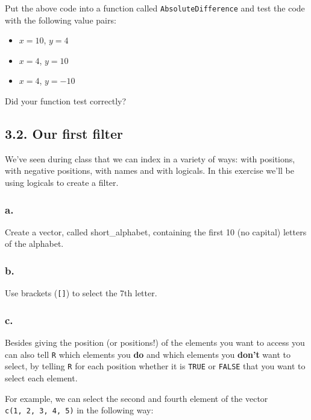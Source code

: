 \documentclass[]{article}
\providecommand{\tightlist}{%
  \setlength{\itemsep}{0pt}\setlength{\parskip}{0pt}}
\begin{document}
Put the above code into a function called \texttt{AbsoluteDifference}
and test the code with the following value pairs:

\begin{itemize}
\tightlist
\item
  \(x=10\), \(y=4\)
\item
  \(x=4\), \(y=10\)
\item
  \(x=4\), \(y=-10\)
\end{itemize}

Did your function test correctly?

\hypertarget{our-first-filter}{%
\subsection{3.2. Our first filter}\label{our-first-filter}}

We've seen during class that we can index in a variety of ways: with
positions, with negative positions, with names and with logicals. In
this exercise we'll be using logicals to create a filter.

\hypertarget{a.-5}{%
\subsubsection{a.}\label{a.-5}}

Create a vector, called short\_alphabet, containing the first 10 (no
capital) letters of the alphabet.

\hypertarget{b.-5}{%
\subsubsection{b.}\label{b.-5}}

Use brackets (\texttt{{[}{]}}) to select the 7th letter.

\hypertarget{c.-5}{%
\subsubsection{c.}\label{c.-5}}

Besides giving the position (or positions!) of the elements you want to
access you can also tell \texttt{R} which elements you \textbf{do} and
which elements you \textbf{don't} want to select, by telling \texttt{R}
for each position whether it is \texttt{TRUE} or \texttt{FALSE} that you
want to select each element.

For example, we can select the second and fourth element of the vector
\texttt{c(1,\ 2,\ 3,\ 4,\ 5)} in the following way:
\end{document}
